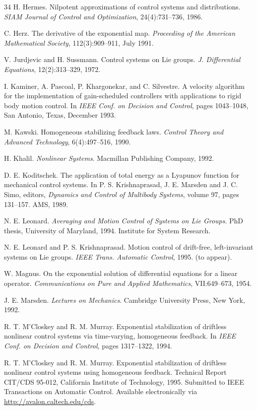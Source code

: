\documentclass[11pt]{article}
\begin{document}
\begin{thebibliography}{34}
 H. Hermes. Nilpotent approximations of control systems and distributions. \emph{SIAM Journal of Control and Optimization}, 24(4):731--736, 1986.

 C. Herz. The derivative of the exponential map. \emph{Proceeding of the American Mathematical Society}, 112(3):909--911, July 1991.

 V. Jurdjevic and H. Sussmann. Control systems on Lie groups. \emph{J. Differential Equations}, 12(2):313--329, 1972.

 I. Kaminer, A. Pascoal, P. Khargonekar, and C. Silvestre. A velocity algorithm for the implementation of gain-scheduled controllers with applications to rigid body motion control. In \emph{IEEE Conf. on Decision and Control}, pages 1043--1048, San Antonio, Texas, December 1993.

 M. Kawski. Homogeneous stabilizing feedback laws. \emph{Control Theory and Advanced Technology}, 6(4):497--516, 1990.

 H. Khalil. \emph{Nonlinear Systems}. Macmillan Publishing Company, 1992.

 D. E. Koditschek. The application of total energy as a Lyapunov function for mechanical control systems. In P. S. Krishnaprasad, J. E. Marsden and J. C. Simo, editors, \emph{Dynamics and Control of Multibody Systems}, volume 97, pages 131--157. AMS, 1989.

 N. E. Leonard. \emph{Averaging and Motion Control of Systems on Lie Groups}. PhD thesis, University of Maryland, 1994. Institute for System Research.

 N. E. Leonard and P. S. Krishnaprasad. Motion control of drift-free, left-invariant systems on Lie groups. \emph{IEEE Trans. Automatic Control}, 1995. (to appear).

 W. Magnus. On the exponential solution of differential equations for a linear operator. \emph{Communications on Pure and Applied Mathematics}, VII:649--673, 1954.

 J. E. Marsden. \emph{Lectures on Mechanics}. Cambridge University Press, New York, 1992.

 R. T. M'Closkey and R. M. Murray. Exponential stabilization of driftless nonlinear control systems via time-varying, homogeneous feedback. In \emph{IEEE Conf. on Decision and Control}, pages 1317--1322, 1994.

 R. T. M'Closkey and R. M. Murray. Exponential stabilization of driftless nonlinear control systems using homogeneous feedback. Technical Report CIT/CDS 95-012, California Institute of Technology, 1995. Submitted to IEEE Transactions on Automatic Control. Available electronically via \url{http://avalon.caltech.edu/cds}.


\end{thebibliography}
\end{document}
